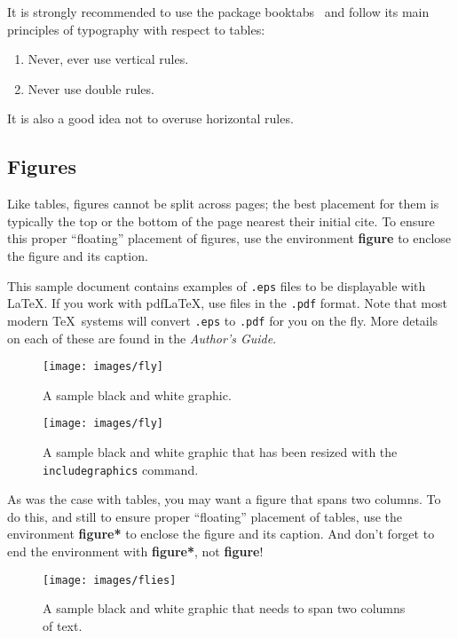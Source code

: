 \documentclass[sigconf]{acmart}
\begin{document}
It is strongly recommended to use the package booktabs~\cite{Fear05}
and follow its main principles of typography with respect to tables:

\begin{enumerate}
\item Never, ever use vertical rules.
\item Never use double rules.
\end{enumerate}

It is also a good idea not to overuse horizontal rules.


\subsection{Figures}

Like tables, figures cannot be split across pages; the best placement
for them is typically the top or the bottom of the page nearest their
initial cite.  To ensure this proper ``floating'' placement of
figures, use the environment \textbf{figure} to enclose the figure and
its caption.

This sample document contains examples of \texttt{.eps} files to be
displayable with \LaTeX.  If you work with pdf\LaTeX, use files in the
\texttt{.pdf} format.  Note that most modern \TeX\ systems will convert
\texttt{.eps} to \texttt{.pdf} for you on the fly.  More details on
each of these are found in the \textit{Author's Guide}.

\begin{figure}
\texttt{[image: images/fly]}
\caption{A sample black and white graphic.}
\end{figure}

\begin{figure}
\texttt{[image: images/fly]}
\caption{A sample black and white graphic
that has been resized with the \texttt{includegraphics} command.}
\end{figure}


As was the case with tables, you may want a figure that spans two
columns.  To do this, and still to ensure proper ``floating''
placement of tables, use the environment \textbf{figure*} to enclose
the figure and its caption.  And don't forget to end the environment
with \textbf{figure*}, not \textbf{figure}!

\begin{figure*}
\texttt{[image: images/flies]}
\caption{A sample black and white graphic
that needs to span two columns of text.}
\end{figure*}
\end{document}
